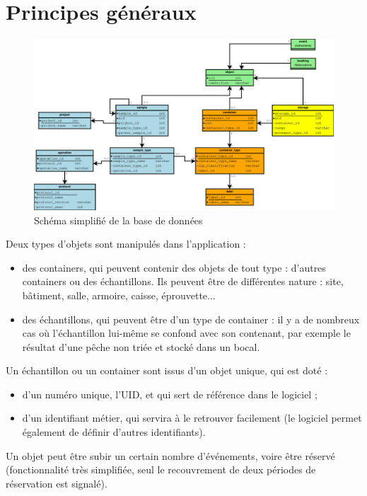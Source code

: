 \section{Principes généraux}

\begin{figure}[H]
\includegraphics[width=\linewidth]{images/db_schema_simplifie}
\caption{Schéma simplifié de la base de données}
\end{figure}

Deux types d'objets sont manipulés dans l'application :
\begin{itemize}
\item des containers, qui peuvent contenir des objets de tout type : d'autres containers ou des échantillons. Ils peuvent être de différentes nature : site, bâtiment, salle, armoire, caisse, éprouvette...
\item des échantillons, qui peuvent être d'un type de container : il y a de nombreux cas où l'échantillon lui-même se confond avec son contenant, par exemple le résultat d'une pêche non triée et stocké dans un bocal.
\end{itemize}

Un échantillon ou un container sont issus d'un objet unique, qui est doté :
\begin{itemize}
\item d'un numéro unique, l'UID, et qui sert de référence dans le logiciel ;
\item d'un identifiant métier, qui servira à le retrouver facilement (le logiciel permet également de définir d'autres identifiants).
\end{itemize}

Un objet peut être subir un certain nombre d'événements, voire être réservé (fonctionnalité très simplifiée, seul le recouvrement de deux périodes de réservation est signalé).

